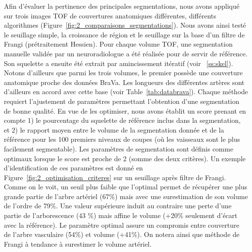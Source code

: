 Afin d'évaluer la pertinence des principales segmentations, nous avons appliqué sur trois images TOF de couvertures anatomiques différentes, différents algorithmes  (Figure~\ref{fig:2_comparaisons_segmentations}). Nous avons ainsi testé le seuillage simple, la croissance de région et le seuillage sur la base d'un filtre de Frangi (prétraitement Hessien). Pour chaque volume TOF, une segmentation manuelle validée par un neuroradiologue a été réalisée pour de servir de référence. Son squelette a ensuite été extrait par amincissement itératif (voir ~\ref{ss:skel}). Notons d'ailleurs que parmi les trois volumes, le premier possède une couverture anatomique proche des données BraVa. Les longueurs des différentes artères sont d'ailleurs en accord avec cette base (voir Table~\ref{tab:databrava}). Chaque méthode requiert l'ajustement de paramètres permettant l'obtention d'une segmentation de bonne qualité. En vue de les optimiser, nous avons établit un score prenant en compte 1) le pourcentage du squelette de référence inclus dans la segmentation, et 2) le rapport moyen entre le volume de la segmentation donnée et de la référence pour les 100 premiers niveaux de coupes (où les vaisseaux sont le plus facilement segmentable). Les paramètres de segmentation sont définis comme optimaux lorsque le score est proche de 2 (somme des deux critères). Un exemple d'identification de ces paramètres est donné en Figure~\ref{fig:2_optimisation_criteres} sur un seuillage après filtre de Frangi.  Comme on le voit, un seuil plus faible que l'optimal permet de récupérer une plus grande partie de l'arbre artériel (67\%) mais avec une surestimation de son volume de l'ordre de 79\%. Une valeur supérieure induit au contraire une perte d'une partie de l'arborescence (43 \%) mais affine le volume (+20\% seulement d'écart avec la référence). Le paramètre optimal assure un compromis entre couverture de l'arbre vasculaire (54\%) et volume (+41\%). On notera ainsi que méthode de Frangi à tendance à surestimer le volume artériel.\\

